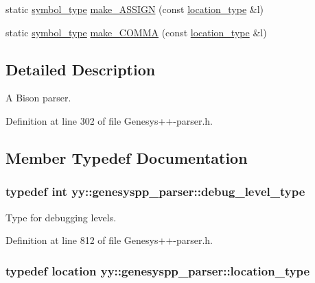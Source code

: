 \begin{DoxyCompactItemize}
\item 
static \hyperlink{classyy_1_1genesyspp__parser_a5b9a172d481d4a62555ee11a7957e789}{symbol\-\_\-type} \hyperlink{classyy_1_1genesyspp__parser_aa238a15ec1aefc02d1c04d2baff3b78d}{make\-\_\-\-A\-S\-S\-I\-G\-N} (const \hyperlink{classyy_1_1genesyspp__parser_aa0276d3782ebff157827ad5e7d44f97c}{location\-\_\-type} \&l)
\item 
static \hyperlink{classyy_1_1genesyspp__parser_a5b9a172d481d4a62555ee11a7957e789}{symbol\-\_\-type} \hyperlink{classyy_1_1genesyspp__parser_a887c58d5f795d08ae8e19f558fdfe886}{make\-\_\-\-C\-O\-M\-M\-A} (const \hyperlink{classyy_1_1genesyspp__parser_aa0276d3782ebff157827ad5e7d44f97c}{location\-\_\-type} \&l)
\end{DoxyCompactItemize}


\subsection{Detailed Description}
A Bison parser. 

Definition at line 302 of file Genesys++-\/parser.\-h.



\subsection{Member Typedef Documentation}
\hypertarget{classyy_1_1genesyspp__parser_a0b40fe1ee9c8daa745e0acbcf25dca16}{
\subsubsection[{debug\-\_\-level\-\_\-type}]{\setlength{\rightskip}{0pt plus 5cm}typedef int {\bf yy\-::genesyspp\-\_\-parser\-::debug\-\_\-level\-\_\-type}}}\label{classyy_1_1genesyspp__parser_a0b40fe1ee9c8daa745e0acbcf25dca16}


Type for debugging levels. 



Definition at line 812 of file Genesys++-\/parser.\-h.

\hypertarget{classyy_1_1genesyspp__parser_aa0276d3782ebff157827ad5e7d44f97c}{
\subsubsection[{location\-\_\-type}]{\setlength{\rightskip}{0pt plus 5cm}typedef {\bf location} {\bf yy\-::genesyspp\-\_\-parser\-::location\-\_\-type}}}\label{classyy_1_1genesyspp__parser_aa0276d3782ebff157827ad5e7d44f97c}


